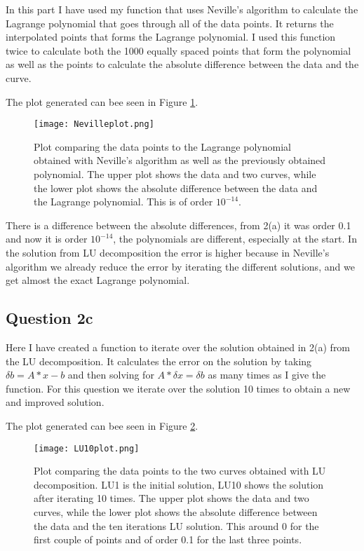 In this part I have used my function that uses Neville's algorithm to calculate the Lagrange polynomial
that goes through all of the data points.
It returns the interpolated points that forms the Lagrange polynomial.
I used this function twice to calculate both the 1000 equally spaced points that form the polynomial
as well as the points to calculate the absolute difference between the data and the curve.

The plot generated can bee seen in Figure \ref{fig:Neville}.

\begin{figure}[h!]
  \centering
  \texttt{[image: Nevilleplot.png]}
  \caption{Plot comparing the data points to the Lagrange polynomial obtained with 
  Neville's algorithm as well as the previously obtained polynomial. The upper plot shows the data and two curves, 
  while the lower plot shows the absolute difference
  between the data and the Lagrange polynomial. This is of order $10^{-14}$.}
  \label{fig:Neville}
\end{figure}

There is a difference between the absolute differences, from 2(a) it was order 0.1 and now it is 
order $10^{-14}$, the polynomials are different, especially at the start.
In the solution from LU decomposition the error is higher because in Neville's algorithm 
we already reduce the error by iterating the different solutions, and we get almost the exact
Lagrange polynomial.

\subsection{Question 2c}

Here I have created a function to iterate over the solution obtained in 2(a) from the LU decomposition.
It calculates the error on the solution by taking $\delta b = A*x - b$ and then solving for 
$A*\delta x = \delta b$ as many times as I give the function.
For this question we iterate over the solution 10 times to obtain a new and improved solution.

The plot generated can bee seen in Figure \ref{fig:LU10}.

\begin{figure}[h!]
  \centering
  \texttt{[image: LU10plot.png]}
  \caption{Plot comparing the data points to the two curves obtained with LU decomposition.
  LU1 is the initial solution, LU10 shows the solution after iterating 10 times.
  The upper plot shows the data and two curves, 
  while the lower plot shows the absolute difference
  between the data and the ten iterations LU solution. 
  This around 0 for the first couple of points and of order 0.1
  for the last three points.}
  \label{fig:LU10}
\end{figure}

